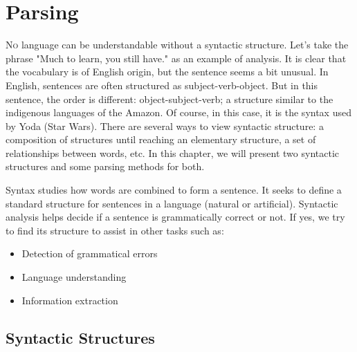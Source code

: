 \documentclass{KodeBook}
\begin{document}
		\mainmatter
	
\fi

\chapter{Parsing}

\begin{introduction}
	\lettrine{N}{o} language can be understandable without a syntactic structure. 
	Let's take the phrase "Much to learn, you still have." as an example of analysis. 
	It is clear that the vocabulary is of English origin, but the sentence seems a bit unusual. 
	In English, sentences are often structured as subject-verb-object. 
	But in this sentence, the order is different: object-subject-verb; a structure similar to the indigenous languages of the Amazon. 
	Of course, in this case, it is the syntax used by Yoda (Star Wars). 
	There are several ways to view syntactic structure: a composition of structures until reaching an elementary structure, a set of relationships between words, etc. 
	In this chapter, we will present two syntactic structures and some parsing methods for both.
\end{introduction}

Syntax studies how words are combined to form a sentence. It seeks to define a standard structure for sentences in a language (natural or artificial). Syntactic analysis helps decide if a sentence is grammatically correct or not. If yes, we try to find its structure to assist in other tasks such as:
\begin{itemize}
	\item Detection of grammatical errors
	\item Language understanding
	\item Information extraction
\end{itemize}


\section{Syntactic Structures}
\end{document}
